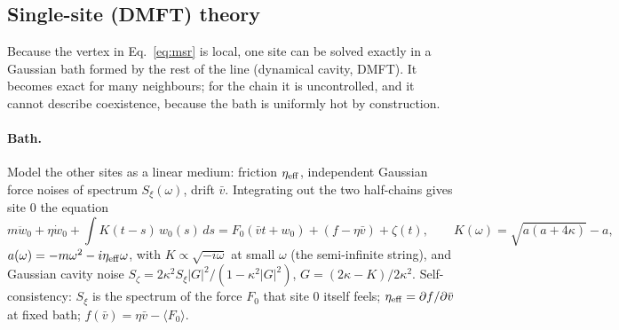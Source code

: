 \documentclass[10pt,a4paper]{article}
\begin{document}
\subsection{Single-site (DMFT) theory}
\label{sec:dmft}

Because the vertex in Eq.~\eqref{eq:msr} is local, one site can be solved exactly in a Gaussian bath formed by the rest of the line (dynamical cavity, DMFT). It becomes exact for many neighbours; for the chain it is uncontrolled, and it cannot describe coexistence, because the bath is uniformly hot by construction.

\paragraph{Bath.} Model the other sites as a linear medium: friction $\eta_{\rm eff}$, independent Gaussian force noises of spectrum $S_\xi(\omega)$, drift $\bar v$. Integrating out the two half-chains gives site 0 the equation
\begin{equation}
m\ddot w_0+\eta\dot w_0+\int K(t-s)\,w_0(s)\,ds=F_0(\bar vt+w_0)+(f-\eta\bar v)+\zeta(t),\qquad
K(\omega)=\sqrt{a(a+4\kappa)}-a,
\end{equation}
$a(\omega)=-m\omega^2-i\eta_{\rm eff}\omega$, with $K\propto\sqrt{-i\omega}$ at small $\omega$ (the semi-infinite string), and Gaussian cavity noise $S_\zeta=2\kappa^2S_\xi|G|^2/(1-\kappa^2|G|^2)$, $G=(2\kappa-K)/2\kappa^2$. Self-consistency: $S_\xi$ is the spectrum of the force $F_0$ that site 0 itself feels; $\eta_{\rm eff}=\partial f/\partial\bar v$ at fixed bath; $f(\bar v)=\eta\bar v-\langle F_0\rangle$.
\end{document}
